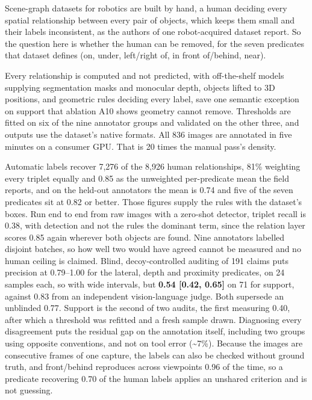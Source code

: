 
Scene-graph datasets for robotics are built by hand, a human deciding every spatial relationship between every pair of objects, which keeps them small and their labels inconsistent, as the authors of one robot-acquired dataset report. So the question here is whether the human can be removed, for the seven predicates that dataset defines (on, under, left/right of, in front of/behind, near).

Every relationship is computed and not predicted, with off-the-shelf models supplying segmentation masks and monocular depth, objects lifted to 3D positions, and geometric rules deciding every label, save one semantic exception on support that ablation A10 shows geometry cannot remove. Thresholds are fitted on six of the nine annotator groups and validated on the other three, and outputs use the dataset's native formats. All 836 images are annotated in five minutes on a consumer GPU. That is 20 times the manual pass's density.

Automatic labels recover 7,276 of the 8,926 human relationships, 81\% weighting every triplet equally and 0.85 as the unweighted per-predicate mean the field reports, and on the held-out annotators the mean is 0.74 and five of the seven predicates sit at 0.82 or better. Those figures supply the rules with the dataset's boxes. Run end to end from raw images with a zero-shot detector, triplet recall is 0.38, with detection and not the rules the dominant term, since the relation layer scores 0.85 again wherever both objects are found. Nine annotators labelled disjoint batches, so how well two would have agreed cannot be measured and no human ceiling is claimed. Blind, decoy-controlled auditing of 191 claims puts precision at 0.79--1.00 for the lateral, depth and proximity predicates, on 24 samples each, so with wide intervals, but \textbf{0.54 [0.42, 0.65]} on 71 for support, against 0.83 from an independent vision-language judge. Both supersede an unblinded 0.77. Support is the second of two audits, the first measuring 0.40, after which a threshold was refitted and a fresh sample drawn. Diagnosing every disagreement puts the residual gap on the annotation itself, including two groups using opposite conventions, and not on tool error (\textasciitilde{}7\%). Because the images are consecutive frames of one capture, the labels can also be checked without ground truth, and front/behind reproduces across viewpoints 0.96 of the time, so a predicate recovering 0.70 of the human labels applies an unshared criterion and is not guessing.

